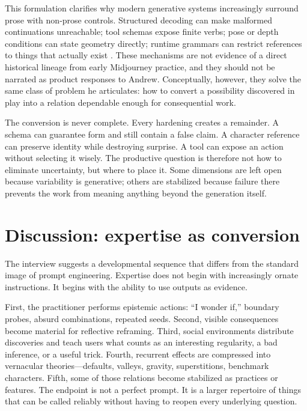 \documentclass[11pt]{article}
\begin{document}
This formulation clarifies why modern generative systems increasingly surround prose with non-prose controls. Structured decoding can make malformed continuations unreachable; tool schemas expose finite verbs; pose or depth conditions can state geometry directly; runtime grammars can restrict references to things that actually exist \citep{openai2024structured,openai2023functioncalling,zhang2023controlnet,zhang2026decodetime}. These mechanisms are not evidence of a direct historical lineage from early Midjourney practice, and they should not be narrated as product responses to Andrew. Conceptually, however, they solve the same class of problem he articulates: how to convert a possibility discovered in play into a relation dependable enough for consequential work.

The conversion is never complete. Every hardening creates a remainder. A schema can guarantee form and still contain a false claim. A character reference can preserve identity while destroying surprise. A tool can expose an action without selecting it wisely. The productive question is therefore not how to eliminate uncertainty, but where to place it. Some dimensions are left open because variability is generative; others are stabilized because failure there prevents the work from meaning anything beyond the generation itself.

\section{Discussion: expertise as conversion}
The interview suggests a developmental sequence that differs from the standard image of prompt engineering. Expertise does not begin with increasingly ornate instructions. It begins with the ability to use outputs as evidence.

First, the practitioner performs epistemic actions: ``I wonder if,'' boundary probes, absurd combinations, repeated seeds. Second, visible consequences become material for reflective reframing. Third, social environments distribute discoveries and teach users what counts as an interesting regularity, a bad inference, or a useful trick. Fourth, recurrent effects are compressed into vernacular theories—defaults, valleys, gravity, superstitions, benchmark characters. Fifth, some of those relations become stabilized as practices or features. The endpoint is not a perfect prompt. It is a larger repertoire of things that can be called reliably without having to reopen every underlying question.
\end{document}
